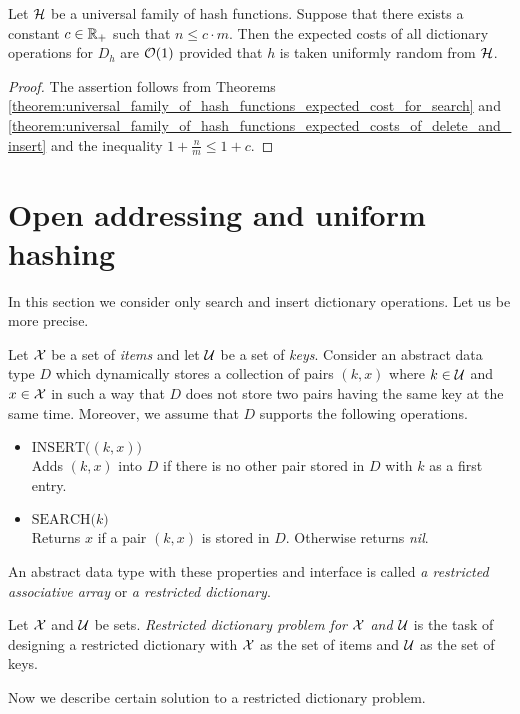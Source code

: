 \begin{corollary}\label{corollary:constant_expected_costs_of_dictionary_operations_for_simple_uniform_hashing}
Let ${\mathcal H}$ be a universal family of hash functions. Suppose that there exists a constant $c\in {\mathbb R}_+$ such that $n\leq c\cdot m$. Then the expected costs of all dictionary operations for $D_h$ are ${\mathcal O}(1)$ provided that $h$ is taken uniformly random from ${\mathcal H}$.
\end{corollary}
\begin{proof}
The assertion follows from Theorems \ref{theorem:universal_family_of_hash_functions_expected_cost_for_search} and \ref{theorem:universal_family_of_hash_functions_expected_costs_of_delete_and_insert} and the inequality $1 + \frac{n}{m} \leq 1 + c$.
\end{proof}

\section{Open addressing and uniform hashing}
\noindent
In this section we consider only search and insert dictionary operations. Let us be more precise.

\begin{definition}
Let ${\mathcal X}$ be a set of \textit{items} and let ${\mathcal U}$ be a set of \textit{keys}. Consider an abstract data type $D$ which dynamically stores a collection of pairs $(k, x)$ where $k\in {\mathcal U}$ and $x\in {\mathcal X}$ in such a way that $D$ does not store two pairs having the same key at the same time. Moreover, we assume that $D$ supports the following operations.
\begin{itemize}
\item[] $\textrm{INSERT}\big((k,x)\big)$\\
Adds $(k,x)$ into $D$ if there is no other pair stored in $D$ with $k$ as a first entry.
\item[] $\textrm{SEARCH}\big(k\big)$\\
Returns $x$ if a pair $(k,x)$ is stored in $D$. Otherwise returns \textit{nil}. 
\end{itemize}
An abstract data type with these properties and interface is called \textit{a restricted associative array} or \textit{a restricted dictionary}.
\end{definition}

\begin{definition}
Let ${\mathcal X}$ and ${\mathcal U}$ be sets. \textit{Restricted dictionary problem for ${\mathcal X}$ and ${\mathcal U}$} is the task of designing a restricted dictionary with ${\mathcal X}$ as the set of items and ${\mathcal U}$ as the set of keys.
\end{definition}
\noindent
Now we describe certain solution to a restricted dictionary problem.

